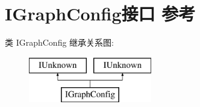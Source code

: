 \hypertarget{interface_i_graph_config}{}\section{I\+Graph\+Config接口 参考}
\label{interface_i_graph_config}
类 I\+Graph\+Config 继承关系图\+:\begin{figure}[H]
\begin{center}
\leavevmode
\includegraphics[height=2.000000cm]{interface_i_graph_config}
\end{center}
\end{figure}

